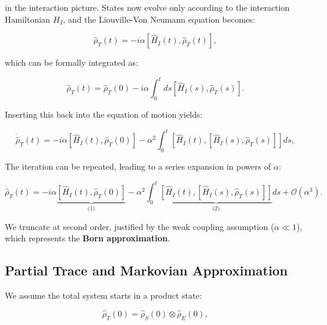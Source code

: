 in the interaction picture. States now evolve only according to the interaction Hamiltonian $H_I$, and the Liouville-Von Neumann equation becomes:

\begin{equation}
	\dot{\hat{\rho}}_T(t) = -i \alpha [\hat{H}_I(t), \hat{\rho}_T(t)],
	\label{eq:LiouvilleVN}
\end{equation}

which can be formally integrated as:

\begin{equation}
	\hat{\rho}_T(t) = \hat{\rho}_T(0) - i \alpha \int_0^t ds [\hat{H}_I(s), \hat{\rho}_T(s)].
	\label{eq:Formal_Integration}
\end{equation}

Inserting this back into the equation of motion yields:

\begin{equation}
	\dot{\hat{\rho}}_T(t) = -i \alpha \left[ \hat{H}_I(t), \hat{\rho}_T(0) \right]
	- \alpha^2 \int_0^t \left[ \hat{H}_I(t), \left[ \hat{H}_I(s), \hat{\rho}_T(s) \right] \right] ds,
	\label{eq:Second_Order_Expansion}
\end{equation}

The iteration can be repeated, leading to a series expansion in powers of $\alpha$:

\begin{equation}
	\dot{\hat{\rho}}_T(t) = -i \alpha \underbrace{\left[ \hat{H}_I(t), \hat{\rho}_T(0) \right]}_{\text{(1)}}
	- \alpha^2 \int_0^t \underbrace{\left[ \hat{H}_I(t), \left[ \hat{H}_I(s), \hat{\rho}_T(s) \right] \right]}_{\text{(2)}} ds + \mathcal{O} (\alpha^3).
	\label{eq:Second_Order_Expansion_truncated}
\end{equation}

We truncate at second order, justified by the weak coupling assumption ($\alpha \ll 1$), which represents the \textbf{Born approximation}.

\subsection{Partial Trace and Markovian Approximation}

We assume the total system starts in a product state:

\begin{equation}
	\hat{\rho}_T(0) = \hat{\rho}_S(0) \otimes \hat{\rho}_E(0),
	\label{eq:Initial_Product_State}
\end{equation}

